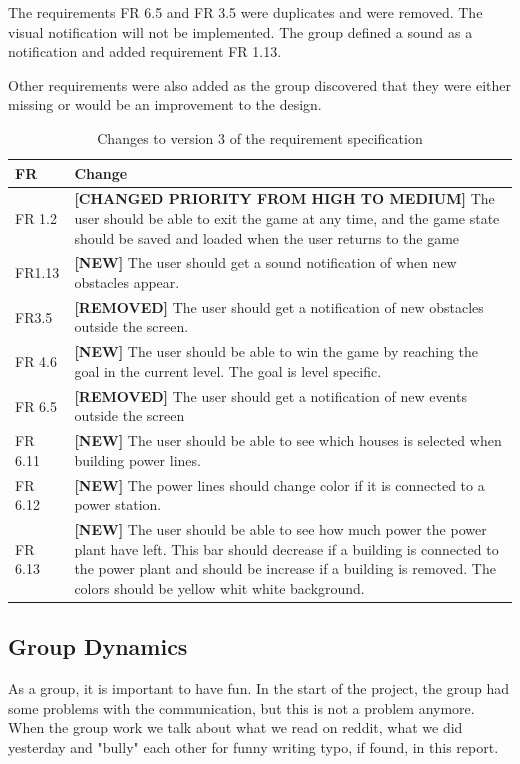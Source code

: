 	The requirements FR 6.5 and FR 3.5 were duplicates and were removed. The visual notification will not be implemented. The group defined a sound as a notification and added requirement FR 1.13.

	Other requirements were also added as the group discovered that they were either missing or would be an improvement to the design.
	
	\begin{table}[H]
	\begin{tabular}{| p{1.5cm} | p{12cm} |}
		\hline
		\rowcolor{lightgray}
		{\bf FR} & {\bf Change} \\ \hline
		FR 1.2 & {\bf \color{orange}[CHANGED PRIORITY FROM HIGH TO MEDIUM]} The user should be able 
		to exit the game at any time, and the game state should be saved and loaded when the user 
		returns to the game \\ \hline
		FR1.13 & {\bf \color{green}[NEW]} The user should get a sound notification of when new obstacles appear. \\ \hline
		FR3.5 & {\bf \color{red}[REMOVED]}  The user should get a notification of new obstacles outside the screen. \\ \hline
		FR 4.6 & {\bf \color{green}[NEW]} The user should be able to win the game by reaching the goal in the current level. The goal is level specific. \\ \hline
		FR 6.5 & {\bf \color{red}[REMOVED]} The user should get a notification of new events outside 
		the screen \\ \hline
		FR 6.11 & {\bf \color{green}[NEW]} The user should be able to see which houses is selected when building power lines. \\ \hline
		FR 6.12 & {\bf \color{green}[NEW]} The power lines should change color if it is connected to a power 
		station. \\ \hline
		FR 6.13 & {\bf \color{green}[NEW]} The user should be able to see how much power the 
		power plant have left. This bar should decrease if a building is connected to the power plant 
		and should be increase if a building is removed. The colors should be yellow whit white 
		background. \\ \hline
	\end{tabular}
	\caption{Changes to version 3 of the requirement specification}
	\end{table}

\subsection{Group Dynamics}
	As a group, it is important to have fun. In the start of the project, the group had some
	problems with the communication, but this is not a problem anymore.
	When the group work we talk about what we read on reddit, what we did yesterday and 
	"bully" each other for funny writing typo, if found, in this report. 

